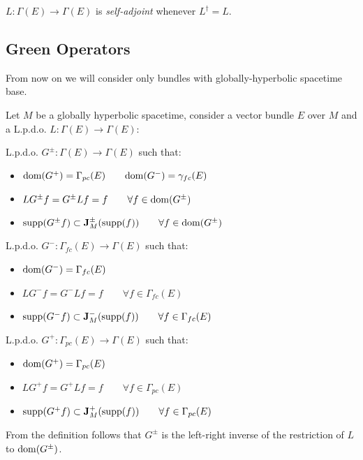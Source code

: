 \documentclass[a4paper,12pt]{scrartcl}    %
\begin{document}
		\begin{notationfix}
			$L:\Gamma(E) \rightarrow \Gamma(E)$ is \emph{self-adjoint} whenever $L^\dagger = L$.
		\end{notationfix}
				
	\subsection{Green Operators}
		\begin{NB}
			From now on we will consider only bundles with globally-hyperbolic spacetime base.
		\end{NB}	
		Let $M$ be a globally hyperbolic spacetime, consider a vector bundle $E$ over $M$ and a L.p.d.o. $L: \Gamma(E) \rightarrow \Gamma(E)$:
		\begin{definition}
			L.p.d.o. $G^\pm : \Gamma (E) \rightarrow \Gamma(E)$ such that:
			\begin{itemize}
			\item $\mathrm{dom}(G^+) = \Gamma_{pc}(E) \qquad \mathrm{dom}(G^-) = \gamma_{fc}(E)$
			\item $LG^\pm f=G^\pm Lf = f \qquad \forall f\in \mathrm{dom}(G^\pm)$
			\item $\textrm{supp}(G^\pm f) \subset \mathbf{J}^\pm_M (\textrm{supp}(f)) \qquad \forall f\in \mathrm{dom}(G^\pm)$
			\end{itemize}
		\end{definition}
		\begin{definition}
			L.p.d.o. $G^- : \Gamma_{fc} (E) \rightarrow \Gamma(E)$ such that:
			\begin{itemize}
			\item $\mathrm{dom}(G^-) = \Gamma_{fc}(E)$
			\item $LG^-f=G^-Lf = f \qquad \forall f\in \Gamma_{fc}(E)$
			\item $\textrm{supp}(G^- f) \subset \mathbf{J}^-_M (\textrm{supp}(f)) \qquad \forall f\in \Gamma_{fc}(E)$
			\end{itemize}
		\end{definition}
		\begin{definition}
			L.p.d.o. $G^+ : \Gamma_{pc} (E) \rightarrow \Gamma(E)$ such that:
			\begin{itemize}
			\item $\mathrm{dom}(G^+) = \Gamma_{pc}(E)$
			\item $LG^+f=G^+Lf = f \qquad \forall f\in \Gamma_{pc}(E)$
			\item $\textrm{supp}(G^+ f) \subset \mathbf{J}^+_M (\textrm{supp}(f)) \qquad \forall f\in \Gamma_{pc}(E)$
			\end{itemize}
		\end{definition}
		\begin{observation}
			From the definition follows that $G^\pm$ is the left-right inverse of the restriction of $L$ to $\mathrm{dom}(G^\pm)$.
		\end{observation}
\end{document}
